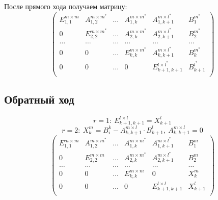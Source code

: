 \documentclass[12pt]{article}
\begin{document}
            После прямого хода получаем матрицу:
            \[
            \left(
            \begin{array}{ccccc|c}
                E_{1,1}^{m \times m} & A_{1,2}^{m \times m^*} & \ldots & A_{1,k}^{m \times m^*} & A_{1,k+1}^{m \times l^*}    & B^{m^*}_{1}   \\  
                0                    & E_{2,2}^{m \times m^*} & \ldots & A_{2,k}^{m \times m^*} & A_{2,k+1}^{m \times l^*}    & B^{m^*}_{2}   \\  
                \ldots               & \ldots                 & \ldots & \ldots                 & \ldots                      & \ldots        \\  
                0                    & 0                      & \ldots & E_{k,k}^{m \times m^*} & A_{k,k+1}^{m \times l^*}    & B^{m^*}_{k}   \\  
                0                    & 0                      & \ldots & 0                      & E_{k+1, k+1}^{l \times l^*} & B^{l^*}_{k+1} \\  
            \end{array} 
            \right)
            \]

        \subsection{Обратный ход}
        
        \[r = 1: \ E_{k + 1, k + 1}^{l \times l} = X_{k+1}^{l}\]    
        \[r = 2: \ X_{k}^{m} = B_{i}^{k} - A^{m \times l}_{k,k+1} \cdot B^{l}_{k+1},\ A^{m \times l}_{k,k+1} = 0 \]
        \[
        \left(
        \begin{array}{ccccc|c}
            E_{1,1}^{m \times m} & A_{1,2}^{m \times m^*} & \ldots & A_{1,k}^{m \times m^*} & A_{1,k+1}^{m \times l^*}  & B^{m}_{1}   \\  
            0                    & E_{2,2}^{m \times m}   & \ldots & A_{2,k}^{m \times m^*} & A_{2,k+1}^{m \times l^*}  & B^{m}_{2}   \\  
            \ldots               & \ldots                 & \ldots & \ldots                 & \ldots                    & \ldots      \\  
            0                    & 0                      & \ldots & E_{k,k}^{m \times m}   & 0                         & X^{m}_{k}   \\  
            0                    & 0                      & \ldots & 0                      & E_{k+1, k+1}^{l \times l} & X^{l}_{k+1} \\  
        \end{array}
        \right)
        \]
\end{document}
